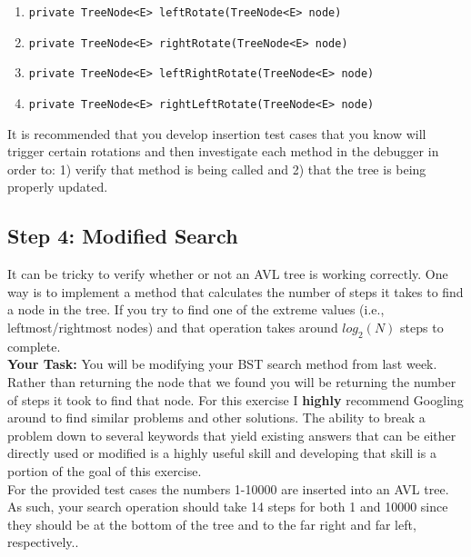 \documentclass[a4paper]{article}
\begin{document}
\begin{enumerate}
    \item \lstinline|private TreeNode<E> leftRotate(TreeNode<E> node)|
    \item \lstinline|private TreeNode<E> rightRotate(TreeNode<E> node)|
    \item \lstinline|private TreeNode<E> leftRightRotate(TreeNode<E> node)|
    \item \lstinline|private TreeNode<E> rightLeftRotate(TreeNode<E> node)|
\end{enumerate}

It is recommended that you develop insertion test cases that you know will
trigger certain rotations and then investigate each method in the debugger in
order to: 1) verify that method is being called and 2) that the tree is being
properly updated.



\subsection{Step 4: Modified Search}

It can be tricky to verify whether or not an AVL tree is working correctly. One
way is to implement a method that calculates the number of steps it takes to
find a node in the tree. If you try to find one of the extreme values (i.e., leftmost/rightmost nodes)
and that operation takes around $log_2(N)$ steps to complete.\\

\textbf{Your Task:} You will be modifying your BST search method from last week. Rather than returning the node
that we found you will be returning the number of steps it took to find that node. For this exercise I \textbf{highly}
recommend Googling around to find similar problems and other solutions. The ability to break a problem down to several
keywords that yield existing answers that can be either directly used or modified is a highly useful skill and developing
that skill is a portion of the goal of this exercise.\\

For the provided test cases the numbers 1-10000 are inserted into an AVL tree. As such, your search operation should take 14
steps for both 1 and 10000 since they should be at the bottom of the tree and to the far right and far left, respectively..
\end{document}

